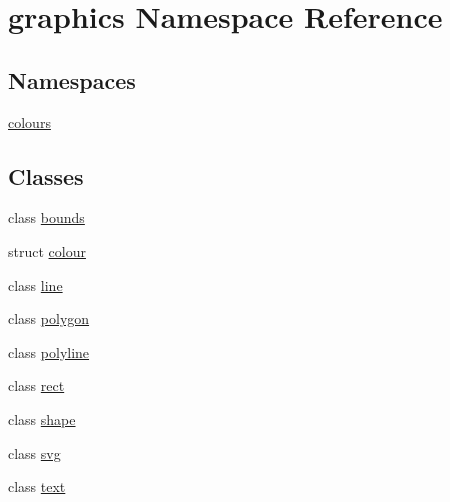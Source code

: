 \hypertarget{namespacegraphics}{}\section{graphics Namespace Reference}
\label{namespacegraphics}
\subsection*{Namespaces}
\begin{DoxyCompactItemize}
\item 
 \hyperlink{namespacegraphics_1_1colours}{colours}
\end{DoxyCompactItemize}
\subsection*{Classes}
\begin{DoxyCompactItemize}
\item 
class \hyperlink{classgraphics_1_1bounds}{bounds}
\item 
struct \hyperlink{structgraphics_1_1colour}{colour}
\item 
class \hyperlink{classgraphics_1_1line}{line}
\item 
class \hyperlink{classgraphics_1_1polygon}{polygon}
\item 
class \hyperlink{classgraphics_1_1polyline}{polyline}
\item 
class \hyperlink{classgraphics_1_1rect}{rect}
\item 
class \hyperlink{classgraphics_1_1shape}{shape}
\item 
class \hyperlink{classgraphics_1_1svg}{svg}
\item 
class \hyperlink{classgraphics_1_1text}{text}
\end{DoxyCompactItemize}
